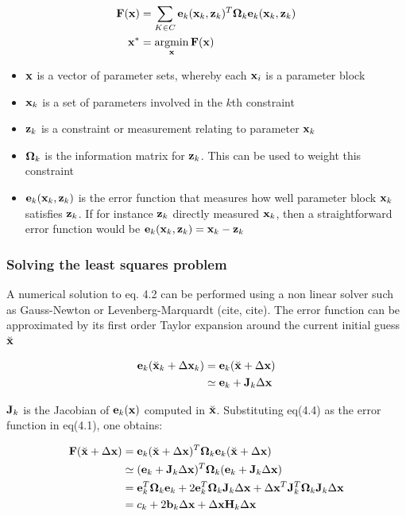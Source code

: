  \begin{align}
   \bv{F}(\bv x) &= \sum\limits_{K \in C}^{} 
                 \bv e_k(\bv x_k, \bv z_k)^T 
                 \bv \Omega_k
                 \bv e_k(\bv x_k, \bv z_k)  \\ 
   \bv x^* &= \operatornamewithlimits{argmin}\limits_{\bv x}\bv{F}(\bv x)
 \end{align}

\begin{itemize}
 \item $\mathbf x$ is a vector of parameter sets, whereby each $\mathbf x_i$ is a parameter block
 \item $\mathbf x_k$ is a set of parameters involved in the $k$th constraint
 \item $\mathbf z_k$ is a constraint or measurement relating to parameter $\mathbf x_k$
 \item $\mathbf \Omega_k$ is the information matrix for $\mathbf z_k$.  This can be used to weight this constraint
 \item $\mathbf e_k(\mathbf x_k, \mathbf z_k)$ is the error function that measures how well parameter block $\mathbf x_k$ satisfies $\mathbf z_k$.  If for instance $\mathbf z_k$ directly measured $\mathbf x_k$, then a straightforward error function would be $\mathbf e_k(\mathbf x_k, \mathbf z_k) = \mathbf x_k - \mathbf z_k $
\end{itemize}

\subsubsection{Solving the least squares problem}

A numerical solution to eq. 4.2 can be performed using a non linear solver such as Gauss-Newton or Levenberg-Marquardt (cite, cite).  The error function can be approximated by its first order Taylor expansion around the current initial guess $\breve{\mathbf x}$

\begin{align}
  \mathbf e_k(\breve{\mathbf x}_k + \Delta \mathbf x_k) &= \mathbf e_k(\breve{\mathbf x} + \Delta \mathbf x) \\
      & \simeq \mathbf e_k + \mathbf J_k \Delta \mathbf x
\end{align}

$\mathbf J_k$ is the Jacobian of $\mathbf e_k(\mathbf x)$ computed in $\breve{\mathbf x}$.  Substituting eq(4.4) as the error function in eq(4.1), one obtains:

\begin{align}
  \mathbf F(\breve{\mathbf x} + \Delta \mathbf x) &= \mathbf e_k(\breve{\mathbf x} + \Delta \mathbf x)^T \mathbf \Omega_k \mathbf e_k(\breve{\mathbf x} + \Delta \mathbf x) \\
  & \simeq (\mathbf e_k + \mathbf J_k \Delta \mathbf x)^T 
    \mathbf \Omega_k 
    (\mathbf e_k + \mathbf J_k \Delta \mathbf x) \\
  &= \mathbf e_k^T \mathbf \Omega_k \mathbf e_k 
    + 2 \mathbf e_k^T \mathbf \Omega_k \mathbf J_k \Delta \mathbf x 
    + \Delta \mathbf x^T \mathbf J_k^T \mathbf \Omega_k \mathbf J_k \Delta \mathbf x \\
  &= c_k + 2\mathbf b_k \Delta \mathbf x + \Delta \mathbf x \mathbf H_k \Delta \mathbf x
\end{align}


